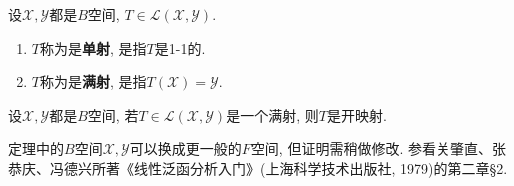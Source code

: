\documentclass[../../main.tex]{subfiles}%
\begin{document}
\begin{definition}
设$\mathscr{X},\mathscr{Y}$都是$B$空间, $T\in\mathscr{L}(\mathscr{X},\mathscr{Y})$.
\begin{enumerate}[(1)]
\item $T$称为是\textbf{单射}, 是指$T$是1-1的.
\item $T$称为是\textbf{满射}, 是指$T(\mathscr{X})=\mathscr{Y}$.
\end{enumerate}
\end{definition}

\begin{theorem}[开映射定理]\label{theorem:泛函分析--开映射定理}
设$\mathscr{X},\mathscr{Y}$都是$B$空间, 若$T\in\mathscr{L}(\mathscr{X},\mathscr{Y})$是一个满射, 则$T$是开映射.
\end{theorem}
\begin{remark}
定理中的$B$空间$\mathscr{X},\mathscr{Y}$可以换成更一般的$F$空间, 但证明需稍做修改. 参看关肇直、张恭庆、冯德兴所著《线性泛函分析入门》(上海科学技术出版社, 1979)的第二章§2.
\end{remark}
\end{document}
